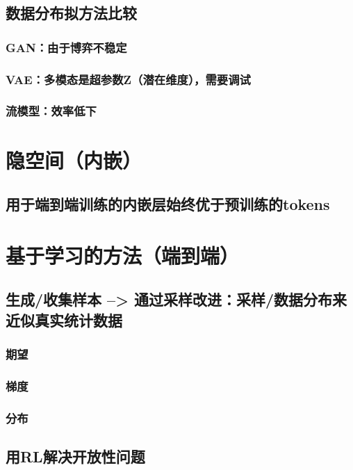 \documentclass[11pt]{article}
\begin{document}
\subsection*{数据分布拟方法比较}
\label{sec:org024d9ce}
\subsubsection*{GAN：由于博弈不稳定}
\label{sec:orgefa2c83}
\subsubsection*{VAE：多模态是超参数Z（潜在维度），需要调试}
\label{sec:org9174a8a}
\subsubsection*{流模型：效率低下}
\label{sec:org810750d}
\section*{隐空间（内嵌）}
\label{sec:org5c87287}
\subsection*{用于端到端训练的内嵌层始终优于预训练的tokens}
\label{sec:org4d69358}
\section*{基于学习的方法（端到端）}
\label{sec:orgf0258c3}
\subsection*{生成/收集样本 --> 通过采样改进：采样/数据分布来近似真实统计数据}
\label{sec:orgf2b3610}
\subsubsection*{期望}
\label{sec:org34ddc56}
\subsubsection*{梯度}
\label{sec:orgf5a3e2c}
\subsubsection*{分布}
\label{sec:orgba88e9d}
\subsection*{用RL解决开放性问题}
\label{sec:orgd675e27}
\end{document}
